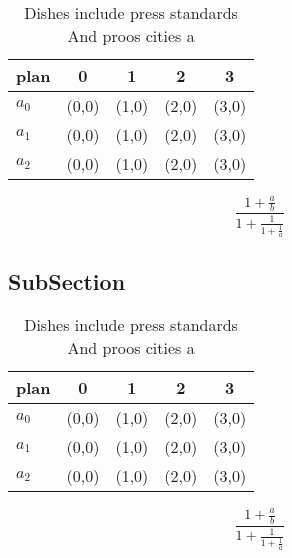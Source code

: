 \documentclass[a4paper]{article}
\begin{document}
\begin{table}
\begin{adjustbox}{width=0.6\columnwidth}
\begin{tabular}{|l|l|l|l|l|}
\hline
\textbf{plan} & \multicolumn{1}{c|}{\textbf{0}} & \multicolumn{1}{c|}{\textbf{1}} & \multicolumn{1}{c|}{\textbf{2}} & \multicolumn{1}{c|}{\textbf{3}} \\ \hline
\textbf{$a_0$}  & (0,0) & (1,0) & (2,0) & (3,0) \\ \hline
\textbf{$a_1$}  & (0,0) & (1,0) & (2,0) & (3,0) \\ \hline
\textbf{$a_2$}  & (0,0) & (1,0) & (2,0) & (3,0) \\ \hline
\end{tabular}
\end{adjustbox}
\caption{Dishes include press standards And proos cities a
}
\end{table}

\[ \frac{1+\frac{a}{b}}{1+\frac{1}{1+\frac{1}{a}}} \]

\subsection{SubSection}

\begin{table}
\begin{adjustbox}{width=0.6\columnwidth}
\begin{tabular}{|l|l|l|l|l|}
\hline
\textbf{plan} & \multicolumn{1}{c|}{\textbf{0}} & \multicolumn{1}{c|}{\textbf{1}} & \multicolumn{1}{c|}{\textbf{2}} & \multicolumn{1}{c|}{\textbf{3}} \\ \hline
\textbf{$a_0$}  & (0,0) & (1,0) & (2,0) & (3,0) \\ \hline
\textbf{$a_1$}  & (0,0) & (1,0) & (2,0) & (3,0) \\ \hline
\textbf{$a_2$}  & (0,0) & (1,0) & (2,0) & (3,0) \\ \hline
\end{tabular}
\end{adjustbox}
\caption{Dishes include press standards And proos cities a
}
\end{table}

\[ \frac{1+\frac{a}{b}}{1+\frac{1}{1+\frac{1}{a}}} \]
\end{document}
